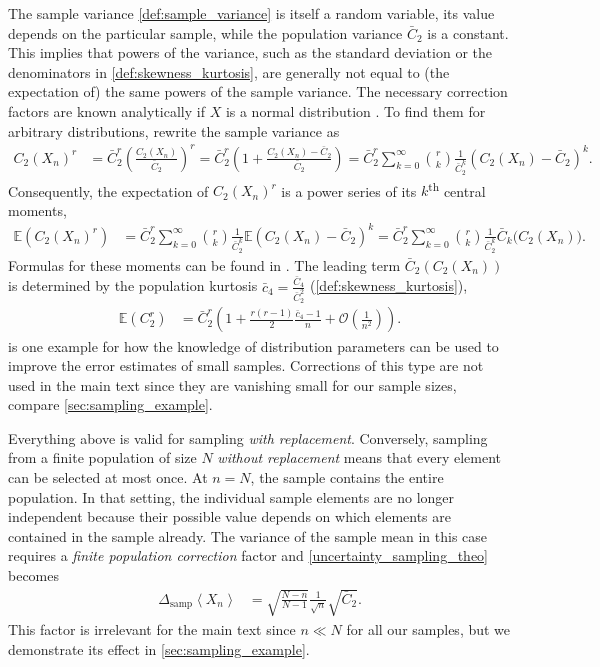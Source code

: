 \documentclass[11pt,a4paper]{article}
\renewcommand{\|}{\rule[-0.4ex]{0.2ex}{1.2em}}
\begin{document}
The sample variance \cref{def:sample_variance} is itself a random variable, its value depends on the particular sample, while the population variance $\bar C_2$ is a constant. This implies that powers of the variance, such as the standard deviation or the denominators in \cref{def:skewness_kurtosis}, are generally not equal to (the expectation of) the same powers of the sample variance. The necessary correction factors are known analytically if $X$ is a normal distribution \cite{holtzman_unbiased_1950}. To find them for arbitrary distributions, rewrite the sample variance as
\begin{align*}
	C_2(X_n)^r &= \bar C_2 ^r \left( \frac{  C_2(X_n)}{\bar C_2 } \right) ^r =  \bar C_2 ^r  \left(  1 + \frac{  C_2(X_n) -\bar C_2 }{\bar C_2 } \right) =\bar C_2^r \sum_{k=0}^\infty  \binom r k \frac{1}{\bar C_2^k} \left( C_2(X_n)-\bar C_2 \right) ^k.
\end{align*}
Consequently, the expectation of $C_2(X_n)^r$ is a power series  of its $k$\textsuperscript{th} central moments,
\begin{align*}
	\mathbb E \left( C_2(X_n)^r \right)   &=  \bar C_2^r \sum_{k=0}^\infty  \binom r k \frac{1}{\bar C_2^k} \mathbb E \left( C_2(X_n)-\bar C_2 \right) ^k= \bar C_2^r \sum_{k=0}^\infty  \binom r k \frac{1}{\bar C_2^k} \bar C_k \Big(   C_2(X_n)\Big). 
\end{align*}
Formulas for these moments can be found in \cite{angelova_moments_2012}. The leading term    $\bar C_2\left( C_2(X_n) \right) $ is determined by the population kurtosis $\bar c_4= \frac{\bar C_4}{\bar C_2^2}$ (\cref{def:skewness_kurtosis}),
\begin{align}\label{kurtosis_correction}
	\mathbb E \left( C_2^r \right) &=  \bar C_2^r \left( 1 +   \frac{r(r-1)}{2}  \frac{\bar c_4 -1}{n}  +\mathcal O \left( \frac{1}{n^2} \right)     \right) . 
\end{align} 
 is one example for how the knowledge of distribution parameters can be used to improve the error estimates of small samples. Corrections of this type are not used in the main text since they are vanishing small for our sample sizes, compare \cref{sec:sampling_example}.

Everything above is valid for sampling \emph{with replacement}. Conversely, sampling from a finite population of size $N$ \emph{without replacement} means that every element can be selected at most once. At $n=N$, the sample contains the entire population. In that setting, the individual sample elements are no longer independent because their possible value depends on which elements are contained in the sample already.  The variance of the sample mean in this case requires a \emph{finite population correction} factor  \cite{davison_bootstrap_1997} and \cref{uncertainty_sampling_theo} becomes
\begin{align}\label{uncertainty_sampling2} 
	\Delta_{\text{samp}} \left \langle X_n \right \rangle  &= \sqrt{\frac{N -n}{N -1}} \frac{1}{\sqrt n } \sqrt{\bar C_2}.
\end{align}
This factor is irrelevant for the main text since $n\ll N$ for all our samples, but we demonstrate its effect in \cref{sec:sampling_example}.
\end{document}
